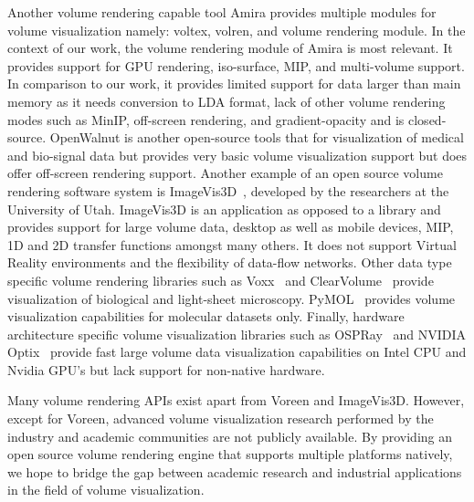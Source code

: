 Another volume rendering capable tool Amira provides multiple modules for volume
visualization namely: voltex, volren, and volume rendering module. In the context
of our work, the volume rendering module of Amira is most relevant. It provides
support for GPU rendering, iso-surface, MIP,
and multi-volume support. In comparison to our work, it provides limited
support for data larger than main memory as it needs conversion to LDA format,
lack of other volume rendering modes such as MinIP, off-screen rendering,
and gradient-opacity and is closed-source. OpenWalnut is another open-source
tools that for visualization of medical and bio-signal data but provides very
basic volume visualization support but does offer off-screen rendering support.
Another example of an open source volume rendering software system is
ImageVis3D~\citep{cibc_imagevis3D:_2016}, developed by the researchers at the
University of Utah. ImageVis3D is an application as opposed to a library and
provides support for large volume data, desktop as well as mobile devices, MIP,
1D and 2D transfer functions amongst many others.  It does not support Virtual
Reality environments and the flexibility of data-flow networks. Other data
type specific volume rendering libraries such as
Voxx~\citep{clendenon_voxx:_2002} and
ClearVolume~\citep{royer_clearvolume:_2015} provide visualization of
biological and light-sheet microscopy.
PyMOL~\citep{schrodinger_llc_pymol_2015} provides volume visualization
capabilities for molecular datasets only. Finally, hardware architecture
specific volume visualization libraries such as
OSPRay~\citep{wald_ospray_2017} and NVIDIA\textsuperscript{\textregistered}
Optix\textsuperscript{\texttrademark}~\citep{parker_optix:_2010} provide fast
large volume data visualization capabilities on Intel CPU and Nvidia GPU's but
lack support for non-native hardware.

Many volume rendering APIs exist apart from Voreen and ImageVis3D. However,
except for Voreen, advanced volume visualization research performed by the
industry and academic communities are not publicly available. By providing an
open source volume rendering engine that supports multiple platforms natively,
we hope to bridge the gap between academic research and industrial applications
in the field of volume visualization.
